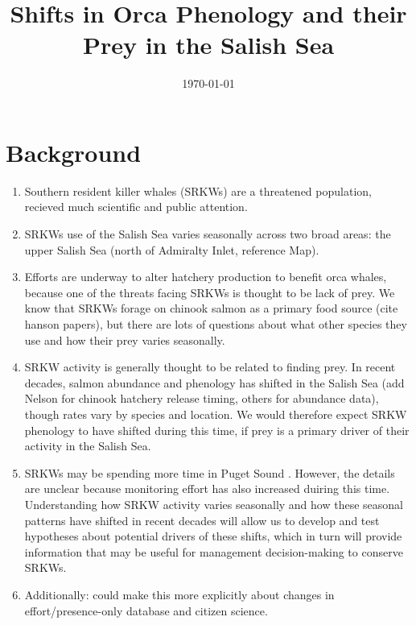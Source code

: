 \documentclass{article}
\begin{document}



\title{Shifts in Orca Phenology and their Prey in the Salish Sea}
\date{\today}
\maketitle

\section* {Background}
\begin{enumerate}
\item Southern resident killer whales (SRKWs) are a threatened population, recieved much scientific and public attention.
\item  SRKWs use of the Salish Sea varies seasonally across two broad areas: the upper Salish Sea 
(north of Admiralty Inlet, reference Map).
\item Efforts are underway to alter hatchery production to benefit orca whales, because one of the threats facing SRKWs is thought to be lack of prey. We know that SRKWs forage on chinook salmon as a primary food source (cite hanson papers), but there are lots of questions about what other species they use and how their prey varies seasonally. 
\item SRKW activity is generally thought to be related to finding prey. In recent decades, salmon abundance and phenology has shifted in the Salish Sea \citep{weinheimer2017,reed2011,ford2006}(add Nelson for chinook hatchery release timing, others for abundance data), though rates vary by species and location. We would therefore expect SRKW phenology to have shifted during this time, if prey is a primary driver of their activity in the Salish Sea. 

\item SRKWs may be spending more time in Puget Sound \citep{olson2018}. However, the details are unclear because monitoring effort has also increased duiring this time. Understanding how SRKW activity varies seasonally and how these seasonal patterns have shifted in recent decades will allow us to develop and test hypotheses about potential drivers of these shifts, which in turn will provide information that may be useful for management decision-making to conserve SRKWs.
\item Additionally: could make this more explicitly about changes in effort/presence-only database and citizen science. 
\end{enumerate}
\end{document}

